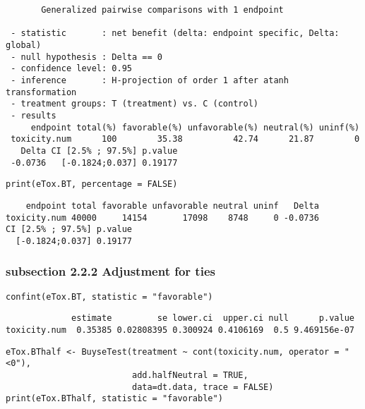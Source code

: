 \documentclass[12pt]{article}
\begin{document}
\begin{verbatim}
       Generalized pairwise comparisons with 1 endpoint

 - statistic       : net benefit (delta: endpoint specific, Delta: global) 
 - null hypothesis : Delta == 0 
 - confidence level: 0.95 
 - inference       : H-projection of order 1 after atanh transformation 
 - treatment groups: T (treatment) vs. C (control) 
 - results
     endpoint total(%) favorable(%) unfavorable(%) neutral(%) uninf(%)
 toxicity.num      100        35.38          42.74      21.87        0
   Delta CI [2.5% ; 97.5%] p.value 
 -0.0736   [-0.1824;0.037] 0.19177
\end{verbatim}

\lstset{language=r,label= ,caption= ,captionpos=b,numbers=none}
\begin{lstlisting}
print(eTox.BT, percentage = FALSE)
\end{lstlisting}

\begin{verbatim}
    endpoint total favorable unfavorable neutral uninf   Delta
toxicity.num 40000     14154       17098    8748     0 -0.0736
CI [2.5% ; 97.5%] p.value
  [-0.1824;0.037] 0.19177
\end{verbatim}


\subsubsection{subsection 2.2.2 Adjustment for ties}
\label{sec:orgc6489b4}

\lstset{language=r,label= ,caption= ,captionpos=b,numbers=none}
\begin{lstlisting}
confint(eTox.BT, statistic = "favorable")
\end{lstlisting}

\begin{verbatim}
             estimate         se lower.ci  upper.ci null      p.value
toxicity.num  0.35385 0.02808395 0.300924 0.4106169  0.5 9.469156e-07
\end{verbatim}



\lstset{language=r,label= ,caption= ,captionpos=b,numbers=none}
\begin{lstlisting}
eTox.BThalf <- BuyseTest(treatment ~ cont(toxicity.num, operator = "<0"),
                         add.halfNeutral = TRUE,
                         data=dt.data, trace = FALSE)
print(eTox.BThalf, statistic = "favorable")
\end{lstlisting}
\end{document}
